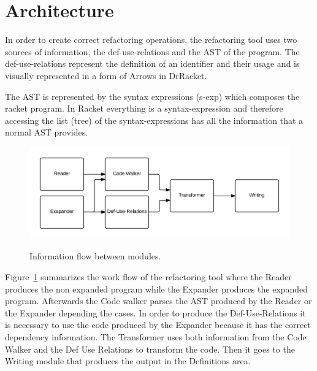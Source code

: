 
\section{Architecture}


In order to create correct refactoring operations, the refactoring tool uses two sources of
information, the def-use-relations and the AST of the program.
The def-use-relations represent the definition of an identifier and their usage and is
 visually represented in a form of Arrows in DrRacket.

The AST is represented by the syntax expressions (s-exp) which composes the racket program.
In Racket everything is a syntax-expression and therefore accessing the list (tree)
of the syntax-expressions has all the information that a normal AST provides. %



\begin{figure}
\centering
\includegraphics[width=\linewidth]{refactoringTool-arch.png}
\label{architecture}
\caption{Information flow between modules.}
\end{figure}
Figure~\ref{architecture} summarizes the work flow of the refactoring tool where
the Reader produces the non expanded program while the Expander produces the
expanded program. Afterwards the Code walker parses the AST produced by the Reader or the Expander depending the
cases. In order to produce the Def-Use-Relations it is necessary to use the code produced by the
Expander because it has the correct dependency information.
The Transformer uses both information from the Code Walker and the Def Use Relations
to transform the code. Then it goes to the Writing module that produces the output
in the Definitions area.

